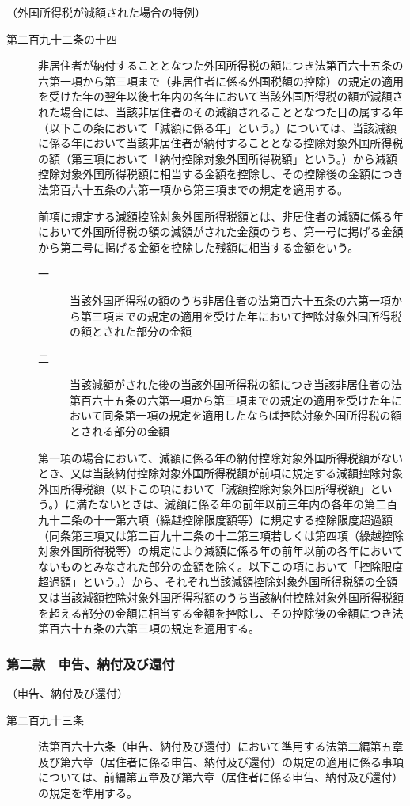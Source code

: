 \documentclass[twocolumn,a4j,10pt]{ltjtarticle}
\begin{document}
\noindent\hspace{10pt}（外国所得税が減額された場合の特例）
\begin{description}
\item[第二百九十二条の十四]非居住者が納付することとなつた外国所得税の額につき法第百六十五条の六第一項から第三項まで（非居住者に係る外国税額の控除）の規定の適用を受けた年の翌年以後七年内の各年において当該外国所得税の額が減額された場合には、当該非居住者のその減額されることとなつた日の属する年（以下この条において「減額に係る年」という。）については、当該減額に係る年において当該非居住者が納付することとなる控除対象外国所得税の額（第三項において「納付控除対象外国所得税額」という。）から減額控除対象外国所得税額に相当する金額を控除し、その控除後の金額につき法第百六十五条の六第一項から第三項までの規定を適用する。
\item[]前項に規定する減額控除対象外国所得税額とは、非居住者の減額に係る年において外国所得税の額の減額がされた金額のうち、第一号に掲げる金額から第二号に掲げる金額を控除した残額に相当する金額をいう。
\begin{description}
\item[一]当該外国所得税の額のうち非居住者の法第百六十五条の六第一項から第三項までの規定の適用を受けた年において控除対象外国所得税の額とされた部分の金額
\item[二]当該減額がされた後の当該外国所得税の額につき当該非居住者の法第百六十五条の六第一項から第三項までの規定の適用を受けた年において同条第一項の規定を適用したならば控除対象外国所得税の額とされる部分の金額
\end{description}
\item[]第一項の場合において、減額に係る年の納付控除対象外国所得税額がないとき、又は当該納付控除対象外国所得税額が前項に規定する減額控除対象外国所得税額（以下この項において「減額控除対象外国所得税額」という。）に満たないときは、減額に係る年の前年以前三年内の各年の第二百九十二条の十一第六項（繰越控除限度額等）に規定する控除限度超過額（同条第三項又は第二百九十二条の十二第三項若しくは第四項（繰越控除対象外国所得税等）の規定により減額に係る年の前年以前の各年においてないものとみなされた部分の金額を除く。以下この項において「控除限度超過額」という。）から、それぞれ当該減額控除対象外国所得税額の全額又は当該減額控除対象外国所得税額のうち当該納付控除対象外国所得税額を超える部分の金額に相当する金額を控除し、その控除後の金額につき法第百六十五条の六第三項の規定を適用する。
\end{description}
\subsubsection*{第二款　申告、納付及び還付}
\noindent\hspace{10pt}（申告、納付及び還付）
\begin{description}
\item[第二百九十三条]法第百六十六条（申告、納付及び還付）において準用する法第二編第五章及び第六章（居住者に係る申告、納付及び還付）の規定の適用に係る事項については、前編第五章及び第六章（居住者に係る申告、納付及び還付）の規定を準用する。
\end{description}
\end{document}
